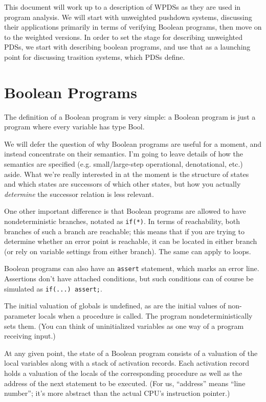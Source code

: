 \documentclass{article}
\newcommand{\code}[1]{\texttt{#1}}
\begin{document}
This document will work up to a description of WPDSs as they are used
in program analysis. We will start with unweighted pushdown systems,
discussing their applications primarily in terms of verifying Boolean
programs, then move on to the weighted versions. In order to set the
stage for describing unweighted PDSs, we start with describing boolean
programs, and use that as a launching point for discussing trasition
systems, which PDSs define.

\section{Boolean Programs}
The definition of a Boolean program is very simple: a Boolean program
is just a program where every variable has type Bool.

We will defer the question of why Boolean programs are useful for a
moment, and instead concentrate on their semantics. I'm going to leave
details of how the semantics are specified (e.g. small/large-step
operational, denotational, etc.) aside. What we're really interested
in at the moment is the structure of states and which states are
successors of which other states, but how you actually
\emph{determine} the successor relation is less relevant.

One other important difference is that Boolean programs are allowed to
have nondeterministic branches, notated as \code{if(*)}. In terms of
reachability, both branches of such a branch are reachable; this means
that if you are trying to determine whether an error point is
reachable, it can be located in either branch (or rely on variable
settings from either branch). The same can apply to loops.

Boolean programs can also have an \code{assert} statement, which marks
an error line. Assertions don't have attached conditions, but such
conditions can of course be simulated as \code{if(...) assert;}.

The initial valuation of globals is undefined, as are the initial
values of non-parameter locals when a procedure is called. The program
nondeterministically sets them. (You can think of uninitialized
variables as one way of a program receiving input.)

At any given point, the state of a Boolean program consists of a
valuation of the local variables along with a stack of activation
records. Each activation record holds a valuation of the locals of the
corresponding procedure as well as the address of the next statement
to be executed. (For us, ``address'' means ``line number''; it's more
abstract than the actual CPU's instruction pointer.)
\end{document}
